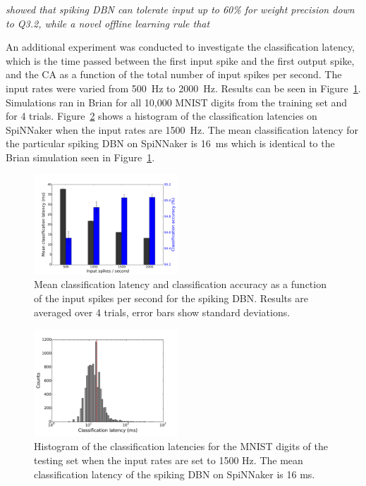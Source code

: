 \citet{} \textit{showed that spiking DBN can tolerate input 
up to 60\% for weight precision down to Q3.2, while a novel offline learning rule that }


An additional experiment was conducted to investigate the classification latency, which is the time passed between the first input spike and the first output spike, and the CA as a function of the total number of input spikes per second. The input rates were varied from 500~Hz to 2000~Hz. Results can be seen in Figure~\ref{Fig:brianLatency}. Simulations ran in Brian for all 10,000 MNIST digits from the training set and for 4 trials. Figure~\ref{Fig:spinnLatency1500hz} shows a histogram of the classification latencies on SpiNNaker when the input rates are 1500~Hz. The mean classification latency for the particular spiking DBN on SpiNNaker is 16~ms which is identical to the Brian simulation seen in Figure~\ref{Fig:brianLatency}.


\begin{figure}[hbt!]
	\centering
	\includegraphics[width=0.48\textwidth]{images/evan/latencyCAfiringrate.pdf}
	\caption{Mean classification latency and classification accuracy as a function of the input spikes per second for the spiking DBN. Results are averaged over 4 trials, error bars show standard deviations.}
	\label{Fig:brianLatency}
\end{figure} 



\begin{figure}[hbt!]
	\centering
	\includegraphics[width=0.48\textwidth]{images/evan/classlatencyIJCNN1500hz.pdf}
	\caption{Histogram of the classification latencies for the MNIST digits of the testing set when the input rates are set to 1500 Hz. The mean classification latency of the spiking DBN on SpiNNaker is 16 ms.}
	\label{Fig:spinnLatency1500hz}
\end{figure} 

